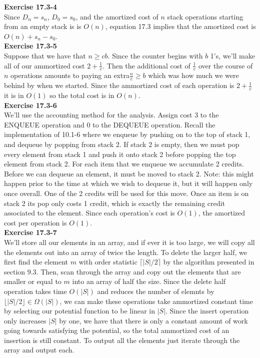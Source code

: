 \documentclass{article}
\begin{document}
\noindent\textbf{Exercise 17.3-4}\\

Since $D_n = s_n$, $D_0 = s_0$, and the amortized cost of $n$ stack operations starting from an empty stack is is $O(n)$, equation 17.3 implies that the amortized cost is $O(n) + s_n - s_0$.\\

\noindent\textbf{Exercise 17.3-5}\\

Suppose that we have that $n\ge c b$. Since the counter begins with $b$ 1's, we'll make all of our ammortized cost $2+ \frac{1}{c}$. Then the additional cost of $\frac{1}{c}$ over the course of $n$ operations amounts to paying an extra$\frac{n}{c} \ge b$ which was how much we were behind by when we started. Since the ammortized cost of each operation is $2+\frac{1}{c}$ it is in $O(1)$ so the total cost is in $O(n)$.\\

\noindent\textbf{Exercise 17.3-6}\\

We'll use the accounting method for the analysis.  Assign cost 3 to the ENQUEUE operation and 0 to the DEQUEUE operation.  Recall the implementation of 10.1-6 where we enqueue by pushing on to the top of stack 1, and dequeue by popping from stack 2.  If stack 2 is empty, then we must pop every element from stack 1 and push it onto stack 2 before popping the top element from stack 2.  For each item that we enqueue we accumulate 2 credits.  Before we can dequeue an element, it must be moved to stack 2.  Note: this might happen prior to the time at which we wish to dequeue it, but it will happen only once overall.  One of the 2 credits will be used for this move.  Once an item is on stack 2 its pop only costs 1 credit, which is exactly the remaining credit associated to the element.  Since each operation's cost is $O(1)$, the amortized cost per operation is $O(1)$.\\

\noindent\textbf{Exercise 17.3-7}\\

We'll store all our elements in an array, and if ever it is too large, we will copy all the elements out into an array of twice the length. To delete the larger half, we first find the element $m$ with order statistic $\lceil|S|/2\rceil$ by the algorithm presented in section 9.3. Then, scan through the array and copy out the elements that are smaller or equal to $m$ into an array of half the size. Since the delete half operation takes time $O(|S|)$ and reduces the number of elemnts by $\lfloor|S|/2\rfloor \in \Omega(|S|)$, we can make these operations take ammortized constant time by selecting our potential function to be linear in $|S|$. Since the insert operation only increases $|S|$ by one, we have that there is only a constant amount of work going towards satisfying the potential, so the total ammortized cost of an insertion is still constant. To output all the elements just iterate through the array and output each.\\
\end{document}
